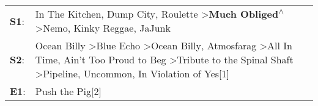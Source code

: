 \begin{supertabular}{p{0.03\textwidth}p{0.92\textwidth}}
 \textbf{S1}:  &                                                                                                                                                                                      In The Kitchen\textsuperscript{}, \enspace Dump City\textsuperscript{}, \enspace Roulette\textsuperscript{} \textgreater \enspace \textbf{Much Obliged\textsuperscript{$\wedge$}} \textgreater \enspace Nemo\textsuperscript{}, \enspace Kinky Reggae\textsuperscript{}, \enspace JaJunk\textsuperscript{}  \enspace  \\
 \textbf{S2}:  &  Ocean Billy\textsuperscript{} \textgreater \enspace Blue Echo\textsuperscript{} \textgreater \enspace Ocean Billy\textsuperscript{}, \enspace Atmosfarag\textsuperscript{} \textgreater \enspace All In Time\textsuperscript{}, \enspace Ain't Too Proud to Beg\textsuperscript{} \textgreater \enspace Tribute to the Spinal Shaft\textsuperscript{} \textgreater \enspace Pipeline\textsuperscript{}, \enspace Uncommon\textsuperscript{}, \enspace In Violation of Yes[1]\textsuperscript{}  \enspace  \\
 \textbf{E1}:  &                                                                                                                                                                                                                                                                                                                                                                                                                                                               Push the Pig[2]\textsuperscript{}  \enspace  \\
\end{supertabular}
